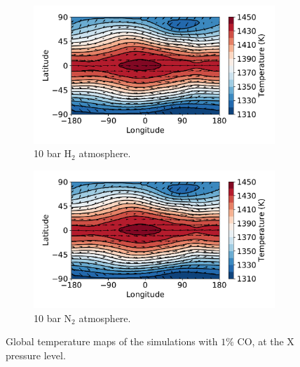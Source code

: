 \begin{figure}
  \centering
  \begin{subfigure}[t]{0.49\textwidth}
    \includegraphics[width=\textwidth]{figures/soc-lava-planets/h2-soc-temp.pdf}
    \caption{10 bar H$_{2}$ atmosphere.}\label{fig:soc-temp-h2}
  \end{subfigure}
  \begin{subfigure}[t]{0.49\textwidth}
    \includegraphics[width=\textwidth]{figures/soc-lava-planets/h2-soc-temp.pdf}
    \caption{10 bar N$_{2}$ atmosphere.}\label{fig:soc-temp-n2}
  \end{subfigure}
  \caption{Global temperature maps of the simulations with $1\%$ CO, at the X pressure level. }
  \label{fig:soc-temp}
\end{figure}

